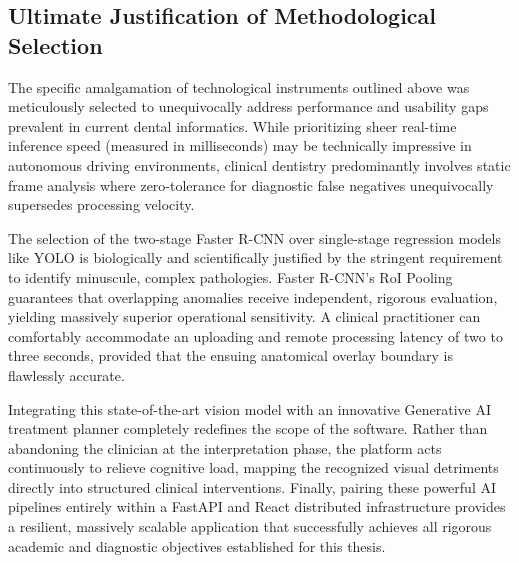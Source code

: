 \subsection{Ultimate Justification of Methodological Selection}
\par The specific amalgamation of technological instruments outlined above was meticulously selected to unequivocally address performance and usability gaps prevalent in current dental informatics. While prioritizing sheer real-time inference speed (measured in milliseconds) may be technically impressive in autonomous driving environments, clinical dentistry predominantly involves static frame analysis where zero-tolerance for diagnostic false negatives unequivocally supersedes processing velocity.
\par The selection of the two-stage Faster R-CNN over single-stage regression models like YOLO is biologically and scientifically justified by the stringent requirement to identify minuscule, complex pathologies. Faster R-CNN's RoI Pooling guarantees that overlapping anomalies receive independent, rigorous evaluation, yielding massively superior operational sensitivity. A clinical practitioner can comfortably accommodate an uploading and remote processing latency of two to three seconds, provided that the ensuing anatomical overlay boundary is flawlessly accurate.
\par Integrating this state-of-the-art vision model with an innovative Generative AI treatment planner completely redefines the scope of the software. Rather than abandoning the clinician at the interpretation phase, the platform acts continuously to relieve cognitive load, mapping the recognized visual detriments directly into structured clinical interventions. Finally, pairing these powerful AI pipelines entirely within a FastAPI and React distributed infrastructure provides a resilient, massively scalable application that successfully achieves all rigorous academic and diagnostic objectives established for this thesis.
